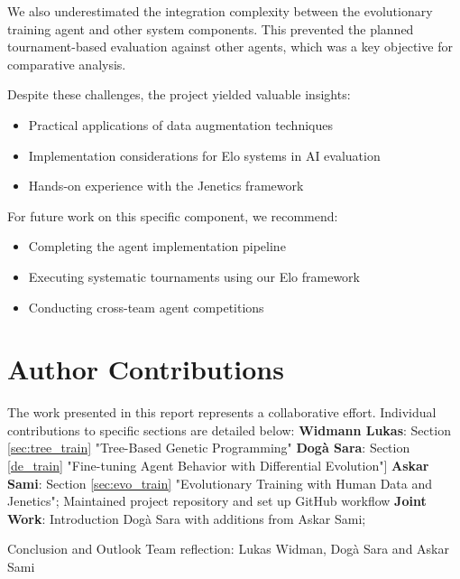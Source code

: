 \documentclass[sigconf]{acmart} %
\begin{document}
We also underestimated the integration complexity between the evolutionary training agent and other system components. This prevented the planned tournament-based evaluation against other agents, which was a key objective for comparative analysis.

Despite these challenges, the project yielded valuable insights:
\begin{itemize}
	\item Practical applications of data augmentation techniques
	\item Implementation considerations for Elo systems in AI evaluation
	\item Hands-on experience with the Jenetics framework
\end{itemize}

For future work on this specific component, we recommend:
\begin{itemize}
	\item Completing the agent implementation pipeline
	\item Executing systematic tournaments using our Elo framework
	\item Conducting cross-team agent competitions
\end{itemize}

\section{Author Contributions}
The work presented in this report represents a collaborative effort. Individual contributions to specific sections are detailed below:
\textbf{Widmann Lukas}: Section \ref{sec:tree_train} "Tree-Based Genetic Programming"
\newline \textbf{Dogà Sara}: Section \ref{de_train} "Fine-tuning Agent Behavior with Differential Evolution"] 
\newline \textbf{Askar Sami}: Section \ref{sec:evo_train} "Evolutionary Training with Human Data and Jenetics"; Maintained project repository and set up GitHub workflow \cite{rmb_github} \newline
	 \textbf{Joint Work}: Introduction Dogà Sara with additions from Askar Sami;
	 
	  Conclusion and Outlook Team reflection: Lukas Widman, Dogà Sara and Askar Sami




\end{document}
